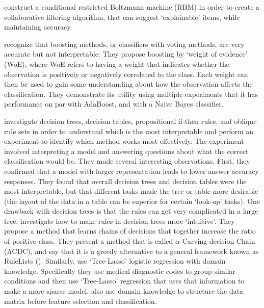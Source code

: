    \citet{Abdollahi2016-vn} construct a conditional restricted Boltzmann machine (RBM) in order to create a collaborative filtering algorithm, that can suggest `explainable' items, while maintaining accuracy. 

    \citet{Ridgeway1998-lv} recognize that boosting methods, or classifiers with voting methods, are very accurate but not interpretable. They propose boosting by `weight of evidence' (WoE), where WoE refers to having a weight that indicates whether the observation is positively or negatively correlated to the class. Each weight can then be used to gain some understanding about how the observation affects the classification. They demonstrate its utility using multiple experiments that it has performance on par with AdaBoost, and with a Naive Bayes classifier.  

    \citet{Huysmans2011-th} investigate decision trees, decision tables, propositional if-then rules, and oblique rule sets in order to understand which is the most interpretable and perform an experiment to identify which method works most effectively. The experiment involved interpreting a model and answering questions about what the correct classification would be. They made several interesting observations. First, they confirmed that a model with larger representation leads to lower answer accuracy responses. They found that overall decision trees and decision tables were the most interpretable, but that different tasks made the tree or table more desirable (the layout of the data in a table can be superior for certain `look-up' tasks). 
One drawback with decision trees is that the rules can get very complicated in a large tree. \citet{Park2016-ld} investigate how to make rules in decision trees more `intuitive'. They propose a method that learns chains of decisions that together increase the ratio of positive class. They present a method that is called $\alpha$-Carving decision Chain (ACDC), and say that it is a greedy alternative to a general framework known as RuleLists (\citet{Wang2015-ww}). 
Similarly, \citet{Jovanovic2016-gw} use `Tree-Lasso' logistic regression with domain knowledge. Specifically they use medical diagnostic codes to group similar conditions and then use `Tree-Lasso' regression that uses that information to make a more sparse model. \citet{Zycinski2012-jj} also use domain knowledge to structure the data matrix before feature selection and classification. 

